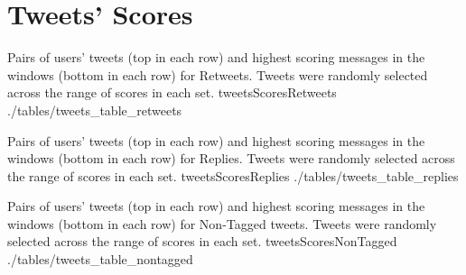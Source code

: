 \chapter{Tweets' Scores}
\tweetTableFull
{Pairs of users' tweets (top in each row) and highest scoring messages in the windows (bottom in each row) for Retweets.  Tweets were randomly selected across the range of scores in each set.}
{tweetsScoresRetweets}
{./tables/tweets_table_retweets}

\tweetTableFull
{Pairs of users' tweets (top in each row) and highest scoring messages in the windows (bottom in each row) for Replies.  Tweets were randomly selected across the range of scores in each set.}
{tweetsScoresReplies}
{./tables/tweets_table_replies}

\tweetTableFull
{Pairs of users' tweets (top in each row) and highest scoring messages in the windows (bottom in each row) for Non-Tagged tweets.  Tweets were randomly selected across the range of scores in each set.}
{tweetsScoresNonTagged}
{./tables/tweets_table_nontagged}

